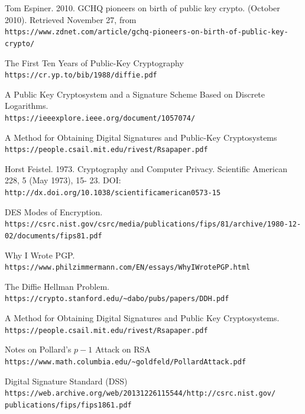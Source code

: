\documentclass[12pt]{report}
\begin{document}
\newpage

\begin{thebibliography}{9}

    Tom Espiner. 2010. GCHQ pioneers on birth of public key crypto. (October 2010). Retrieved November 27, from \\
    \texttt{https://www.zdnet.com/article/gchq-pioneers-on-birth-of-public-key-crypto/}

    The First Ten Years of Public-Key Cryptography\\
    \texttt{https://cr.yp.to/bib/1988/diffie.pdf}

    A Public Key Cryptosystem and a Signature Scheme Based on Discrete Logarithms.\\
    \texttt{https://ieeexplore.ieee.org/document/1057074/}

    A Method for Obtaining Digital Signatures and Public-Key Cryptosystems\\
    \texttt{https://people.csail.mit.edu/rivest/Rsapaper.pdf}

    Horst Feistel. 1973. Cryptography and Computer Privacy. Scientific American 228, 5 (May 1973), 15-
    23. DOI: \\
    \texttt{http://dx.doi.org/10.1038/scientificamerican0573-15}

    DES Modes of Encryption. \\
    \texttt{https://csrc.nist.gov/csrc/media/publications/fips/81/archive/1980-12-02/documents/fips81.pdf}

    Why I Wrote PGP.\\
    \texttt{https://www.philzimmermann.com/EN/essays/WhyIWrotePGP.html}

    The Diffie Hellman Problem.\\
    \texttt{https://crypto.stanford.edu/\~{}dabo/pubs/papers/DDH.pdf}

    A Method for Obtaining Digital Signatures and Public Key Cryptosystems.\\
    \texttt{https://people.csail.mit.edu/rivest/Rsapaper.pdf}

    Notes on Pollard's $p-1$ Attack on RSA\\
    \texttt{https://www.math.columbia.edu/\~{}goldfeld/PollardAttack.pdf}

    Digital Signature Standard (DSS)\\
    \texttt{https://web.archive.org/web/20131226115544/http://csrc.nist.gov/\\publications/fips/fips1861.pdf}


\end{thebibliography}
\end{document}
